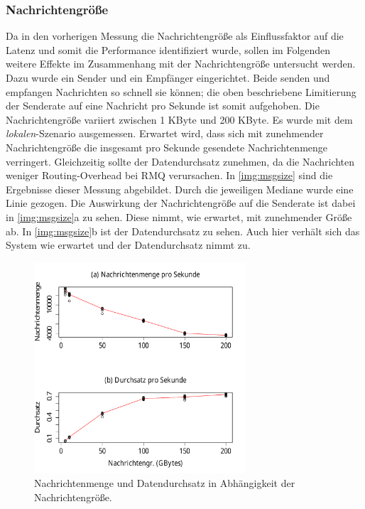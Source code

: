 \subsubsection{Nachrichtengröße}
Da in den vorherigen Messung die Nachrichtengröße als Einflussfaktor auf die Latenz und somit die Performance identifiziert wurde, sollen im Folgenden weitere Effekte im Zusammenhang mit der Nachrichtengröße untersucht werden. Dazu wurde ein Sender und ein Empfänger eingerichtet. Beide senden und empfangen Nachrichten so schnell sie können; die oben beschriebene Limitierung der Senderate auf eine Nachricht pro Sekunde ist somit aufgehoben. Die Nachrichtengröße variiert zwischen 1 KByte und 200 KByte. Es wurde mit dem \textit{lokalen}-Szenario ausgemessen. Erwartet wird, dass sich mit zunehmender Nachrichtengröße die insgesamt pro Sekunde gesendete Nachrichtenmenge verringert. Gleichzeitig sollte der Datendurchsatz zunehmen, da die Nachrichten weniger Routing-Overhead bei RMQ verursachen.
In \autoref{img:msgsize} sind die Ergebnisse dieser Messung abgebildet. Durch die jeweiligen Mediane wurde eine Linie gezogen. Die Auswirkung der Nachrichtengröße auf die Senderate ist dabei in \autoref{img:msgsize}a zu sehen. Diese nimmt, wie erwartet, mit zunehmender Größe ab. In \autoref{img:msgsize}b ist der Datendurchsatz zu sehen. Auch hier verhält sich das System wie erwartet und der Datendurchsatz nimmt zu.
\begin{figure}
\center
  \includegraphics[width=0.7\textwidth]{images/measurement/msg-rate-vs-send-bytes.pdf}
  \caption{Nachrichtenmenge und Datendurchsatz in Abhängigkeit der Nachrichtengröße.}
  \label{img:msgsize}
\end{figure}

